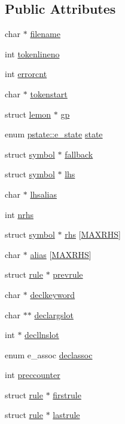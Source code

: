 \subsection*{Public Attributes}
\begin{DoxyCompactItemize}
\item 
char $\ast$ \hyperlink{structpstate_a3046972c535a60e0b5ef0be08bddc3b0}{filename}
\item 
int \hyperlink{structpstate_acfe7adc67da5621e844fca34dd0889ec}{tokenlineno}
\item 
int \hyperlink{structpstate_a1c161d486f203af3e5dc6a3259b56079}{errorcnt}
\item 
char $\ast$ \hyperlink{structpstate_ab43cf3be5456af13f4b51437e7341751}{tokenstart}
\item 
struct \hyperlink{structlemon}{lemon} $\ast$ \hyperlink{structpstate_a0fdae87f13f8df612a9ba09f6ec3b789}{gp}
\item 
enum \hyperlink{structpstate_a55db929db20b5517f8672481cf77d778}{pstate\-::e\-\_\-state} \hyperlink{structpstate_a1524057c2f5cc82fa0e6fc9926ae5fe5}{state}
\item 
struct \hyperlink{structsymbol}{symbol} $\ast$ \hyperlink{structpstate_aa7c42e4ccf94270f715b099fc85fe4b8}{fallback}
\item 
struct \hyperlink{structsymbol}{symbol} $\ast$ \hyperlink{structpstate_aacbcb3ad04c6fb0ffd7e4beaf5606ff2}{lhs}
\item 
char $\ast$ \hyperlink{structpstate_af2137746af3698389f6259f5616c7c3d}{lhsalias}
\item 
int \hyperlink{structpstate_a5a8c0e9f271b6e2f235a6da796c4823d}{nrhs}
\item 
struct \hyperlink{structsymbol}{symbol} $\ast$ \hyperlink{structpstate_ae71c3d93c92a602fb759b4f868d5229c}{rhs} \mbox{[}\hyperlink{lemon_8c_a2f6841589db4dcc8ca996adef30bd039}{M\-A\-X\-R\-H\-S}\mbox{]}
\item 
char $\ast$ \hyperlink{structpstate_abdc4136c5eb9156217a5d323cc798b22}{alias} \mbox{[}\hyperlink{lemon_8c_a2f6841589db4dcc8ca996adef30bd039}{M\-A\-X\-R\-H\-S}\mbox{]}
\item 
struct \hyperlink{structrule}{rule} $\ast$ \hyperlink{structpstate_acd58cd38bed0e78371da67e84ae6b77d}{prevrule}
\item 
char $\ast$ \hyperlink{structpstate_ab4bce0a5ad318611ea7fd0e29942a3c4}{declkeyword}
\item 
char $\ast$$\ast$ \hyperlink{structpstate_ac4efccfc09ac41604466cc899d8ba9bc}{declargslot}
\item 
int $\ast$ \hyperlink{structpstate_a589bc337728f24498f1d5841067cdfc1}{decllnslot}
\item 
enum e\-\_\-assoc \hyperlink{structpstate_a30860ff79023cbc6b234a48bb534f289}{declassoc}
\item 
int \hyperlink{structpstate_a807f9636be0286b1ffbdc32b5d19c7c8}{preccounter}
\item 
struct \hyperlink{structrule}{rule} $\ast$ \hyperlink{structpstate_aa9807a90d93a3e1777609df2d01fa9dc}{firstrule}
\item 
struct \hyperlink{structrule}{rule} $\ast$ \hyperlink{structpstate_ae965736c8e1e422123ca5694cf8146f2}{lastrule}
\end{DoxyCompactItemize}


